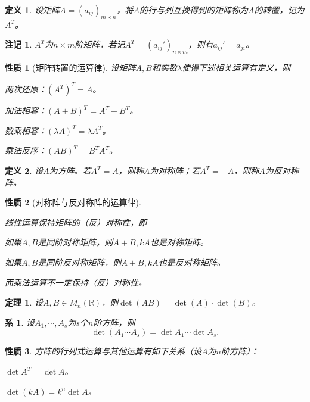 \documentclass[a4paper]{book}
\newtheorem{prop}{性质}[chapter]
\newtheorem{Def}{定义}[chapter]
\newtheorem{cor}{系}[chapter]
\newtheorem{thm}{定理}[chapter]
\newtheorem{rmk}{注记}[chapter]
\newcommand{\enum}{\begin{list}{}{\setlength{\leftmargin}{0pt} \setlength{\itemindent}{2.5em} \setlength{\listparindent}{2em}}}
\begin{document}
\begin{Def}
设矩阵$A=(a_{ij})_{m\times n}$，将$A$的行与列互换得到的矩阵称为$A$的转置，记为$A^T$。
\end{Def}

\begin{rmk}
$A^T$为$n\times m$阶矩阵，若记$A^T = (a_{ij}')_{n\times m}$，则有$a_{ij}' = a_{ji}$。
\end{rmk}

\begin{prop}[矩阵转置的运算律]
设矩阵$A,B$和实数$\lambda$使得下述相关运算有定义，则
\enum
\item[(1)] 两次还原：$(A^T)^T = A$。
\item[(2)] 加法相容：$(A+B)^T = A^T + B^T$。
\item[(3)] 数乘相容：$(\lambda A)^T = \lambda A^T$。
\item[(4)] 乘法反序：$(AB)^T = B^T A^T$。
\end{list}
\end{prop}

\begin{Def}
设$A$为方阵。若$A^T = A$，则称$A$为对称阵；若$A^T = -A$，则称$A$为反对称阵。
\end{Def}

\begin{prop}[对称阵与反对称阵的运算律]\

线性运算保持矩阵的（反）对称性，即
\enum
\item[(1)] 如果$A, B$是同阶对称矩阵，则$A+B, kA$也是对称矩阵。
\item[(2)] 如果$A, B$是同阶反对称矩阵，则$A+B, kA$也是反对称矩阵。
\end{list}
而乘法运算不一定保持（反）对称性。
\end{prop}

\begin{thm}
设$A,B\in M_n(\mathbb{R})$，则$\det(AB) = \det(A)\cdot\det(B)$。
\end{thm}

\begin{cor}
设$A_1,\cdots,A_s$为$s$个$n$阶方阵，则
$$\det(A_1\cdots A_s) = \det A_1\cdots\det A_s.$$
\end{cor}

\begin{prop}
方阵的行列式运算与其他运算有如下关系（设$A$为$n$阶方阵）：
\enum
\item[$\bullet$] $\det A^T = \det A$。
\item[$\bullet$] $\det (kA) = k^n \det A$。
\end{list}
\end{prop}
\end{document}
